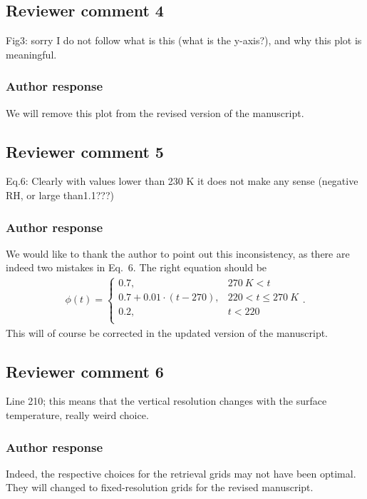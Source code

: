 \documentclass[11pt]{scrartcl}
\begin{document}
\subsection*{Reviewer comment 4}

Fig3: sorry I do not follow what is this (what is the y-axis?), and why this plot is meaningful.

\subsubsection*{Author response}

We will remove this plot from the revised version of the manuscript.


\subsection*{Reviewer comment 5}
Eq.6: Clearly with values lower than 230 K it does not make any sense (negative RH, or large than1.1???)

\subsubsection*{Author response}

We would like to thank the author to point out this inconsistency, as there are indeed two mistakes
in Eq.~6. The right equation should be
\begin{align}
\phi(t) = \begin{cases}
 0.7, & 270\ \unit{K} < t \\
 0.7 + 0.01 \cdot (t - 270), &220 < t \leq  270\ \unit{K} \\
 0.2,  & t < 220 \\
 \end{cases}.
\end{align}
This will of course be corrected in the updated version of the manuscript.

\subsection*{Reviewer comment 6}
Line 210; this means that the vertical resolution changes with the surface temperature, really weird choice.

\subsubsection*{Author response}

Indeed, the respective choices for the retrieval grids may not have been optimal.
They will changed to fixed-resolution grids for the revised manuscript.
\end{document}

